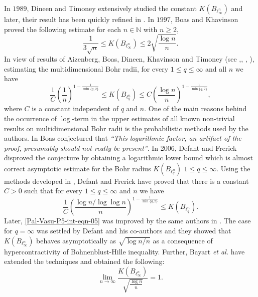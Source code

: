 \documentclass[a4paper,12pt]{amsart}
\theoremstyle{definition}
\newcounter {own}
\begin{document}
 In $1989$, Dineen and Timoney \cite{Dineen-Timoney-1989} extensively studied the constant $K(B_{\ell^n _\infty})$ and later, their result has been quickly refined in \cite{boas-1997}. In $1997$, Boas and Khavinson \cite{boas-1997} proved the following estimate for each $n \in \mathbb{N}$ with $n \geq 2$,
 \begin{equation*}
 	\frac{1}{3\sqrt{n}} \leq K(B_{\ell^n_{\infty}}) \leq 2 \sqrt{\frac{\log n}{n}}.	
 \end{equation*}
 In view of results of Aizenberg, Boas, Dineen, Khavinson and Timoney (see \cite{aizn-2000a},\cite{boas-1997}, \cite{boas-2000}, \cite{Dineen-Timoney-1989}), estimating the multidimensional Bohr radii, for every $1\leq q\leq \infty$ and all $n$ we have
 \begin{equation*}
 	\frac{1}{C}\left(\frac{1}{n}\right)^{1-\frac{1}{\min\{q,2\}}}\leq K(B_{\ell^n_q})\leq C\left(\frac{\log n}{n}\right)^{1-\frac{1}{\min\{q,2\}}},
 \end{equation*}
 where $C$ is a constant independent of $q$ and $n$. One of the main reasons behind the occurrence of $\log$-term in the upper estimates of all known non-trivial results on multidimensional Bohr radii is the probabilistic methods used by the authors. In \cite[p. 326]{boas-2000} Boas conjectured that {\it ``This logarithmic factor, an artifact of the proof, presumably should not really be present''}. In 2006, Defant and Frerick \cite{defant-2006} disproved the conjecture by obtaining a logarithmic lower bound which is almost correct asymptotic estimate for the Bohr radius $K(B_{\ell^n_q})\,\, 1\leq q\leq \infty$. Using the methods developed in \cite{defant-2003}, Defant and Frerick \cite{defant-2006} have proved that there is a constant $C>0$ such that for every $1\leq q\leq \infty$ and $n$ we have
 \begin{equation}\label{Pal-Vasu-P5-int-eqn-05}
 	\frac{1}{C}\left(\frac{\log n/\log \log n}{n}\right)^{1-\frac{1}{\min\{q,2\}}}\leq K(B_{\ell^n_q}).
 \end{equation}
 Later, \eqref{Pal-Vasu-P5-int-eqn-05} was improved by the same authors in \cite{defant-angew-2011}. The case for $q=\infty$ was settled by Defant and his co-authors \cite{defant-2011} and they showed that $K(B_{\ell^n_{\infty}})$ behaves asymptotically as $\sqrt{\log n/n}$ as a consequence of hypercontractivity of Bohnenblust-Hille inequality. Further, Bayart {\it et al.} \cite{bayart-advance-2014} have extended the techniques and obtained the following:
 \begin{equation*}
 	\lim_{n\rightarrow \infty}\frac{K(B_{\ell^n_{\infty}})}{\sqrt{\frac{\log n}{n}}}=1.
 \end{equation*}
 
\end{document}
